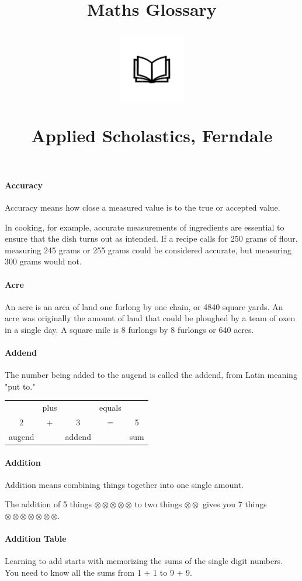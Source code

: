 \documentclass[12pt]{article}
\title{Maths Glossary\\
\begin{center}
\includegraphics[width=4em]{ApS_logo.png}
\end{center}
\begin{normalsize}Applied Scholastics, Ferndale \end{normalsize}}
\author{}
\date{}
\begin{document}
\maketitle

\paragraph{Accuracy}
Accuracy means how close a measured value is to the true or accepted value.

In cooking, for example, accurate measurements of ingredients are essential to ensure that the dish turns out as intended. If a recipe calls for 250 grams of flour, measuring 245 grams or 255 grams could be considered accurate, but measuring 300 grams would not.

\paragraph{Acre}
An acre is an area of land one furlong by one chain, or 4840 square yards. An acre was originally the amount of land that could be ploughed by a team of oxen in a single day. A square mile is 8 furlongs by 8 furlongs or 640 acres.

\paragraph{Addend}
The number being added to the augend is called the addend, from Latin meaning "put to."

\begin{table}[H]
    \centering
    \begin{tabular}{ccccc}
     \   & plus &   \    & equals &  \ \\
     \large{2}   &  \large{+}   &   \large{3}    &   \large{=}    &  \large{5} \\
  augend &  \   & addend &   \    & sum
    \end{tabular}
\end{table}

\paragraph{Addition}
Addition means combining things together into one single amount.

The addition of 5 things $\otimes\otimes\otimes\otimes\otimes$ to two things $\otimes\otimes$ gives you 7 things $\otimes\otimes\otimes\otimes\otimes\otimes\otimes$.

\paragraph{Addition Table}
Learning to add starts with memorizing the sums of the single digit numbers. You need to know all the sums from 1 + 1 to 9 + 9.
\end{document}
